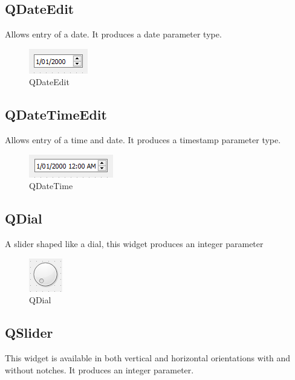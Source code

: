 \documentclass[a4paper,10pt]{book}
\begin{document}
\subsection{QDateEdit}

Allows entry of a date. It produces a date parameter type.

\begin {figure}[!ht]
 \centering
 \includegraphics[scale=1.0]{images/widget/qdateedit}
 \caption{QDateEdit}
\end {figure}


\subsection{QDateTimeEdit}

Allows entry of a time and date. It produces a timestamp parameter type.

\begin {figure}[!ht]
 \centering
 \includegraphics[scale=1.0]{images/widget/qdatetimeedit}
 \caption{QDateTime}
\end {figure}

\subsection{QDial}
A slider shaped like a dial, this widget produces an integer parameter

\begin {figure}[!ht]
 \centering
 \includegraphics[scale=1.0]{images/widget/qdial}
 \caption{QDial}
\end {figure}

\subsection{QSlider}

This widget is available in both vertical and horizontal orientations with and without notches. It produces an integer parameter.
\end{document}
